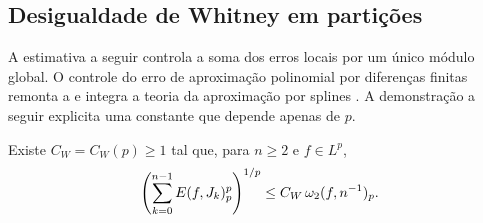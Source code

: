 \documentclass[12pt,a4paper]{article}
\begin{document}
\subsection{Desigualdade de Whitney em partições}

A estimativa a seguir controla a soma dos erros locais por um único módulo global. O controle do erro de aproximação polinomial por diferenças finitas remonta a \citet{artigo_2-whitney1957} e integra a teoria da aproximação por splines \citep{artigo_2-devorelorentz1993}. A demonstração a seguir explicita uma constante que depende apenas de $p$.

\begin{lema}
\label{lp:lem:whitney}
Existe $C_W=C_W(p)\ge1$ tal que, para $n\ge2$ e $f\in L^p$,
\begin{equation}
 \left(\sum_{k=0}^{n-1}E(f,J_k)_p^p\right)^{1/p}
 \le C_W\,\omega_2(f,n^{-1})_{p}.
 \label{lp:eq:whitney-partition}
\end{equation}
\end{lema}
\end{document}
